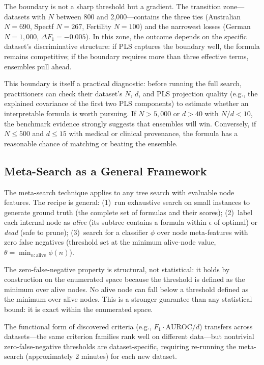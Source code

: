 \documentclass[journal]{IEEEtran}
\begin{document}
The boundary is not a sharp threshold but a gradient.  The transition
zone---datasets with $N$ between 800 and 2{,}000---contains the
three ties (Australian $N = 690$, Spectf $N = 267$, Fertility
$N = 100$) and the narrowest losses (German $N = 1{,}000$,
$\Delta F_1 = -0.005$).  In this zone, the outcome depends on the
specific dataset's discriminative structure: if PLS captures the
boundary well, the formula remains competitive; if the boundary
requires more than three effective terms, ensembles pull ahead.

This boundary is itself a practical diagnostic: before running the
full search, practitioners can check their dataset's $N$, $d$, and
PLS projection quality (e.g., the explained covariance of the first
two PLS components) to estimate whether an interpretable formula is
worth pursuing.  If $N > 5{,}000$ or $d > 40$ with $N/d < 10$, the
benchmark evidence strongly suggests that ensembles will win.
Conversely, if $N \leq 500$ and $d \leq 15$ with medical or
clinical provenance, the formula has a reasonable chance of matching
or beating the ensemble.

\subsection{Meta-Search as a General Framework}
\label{sec:meta-general}

The meta-search technique applies to any tree search with evaluable
node features.  The recipe is general:
(1)~run exhaustive search on small instances to generate ground truth
(the complete set of formulas and their scores);
(2)~label each internal node as \emph{alive} (its subtree contains a
formula within $\epsilon$ of optimal) or \emph{dead} (safe to prune);
(3)~search for a classifier $\phi$ over node meta-features with zero
false negatives (threshold set at the minimum alive-node value,
$\theta = \min_{n:\text{alive}} \phi(n)$).

The zero-false-negative property is structural, not statistical:
it holds by construction on the enumerated space because the
threshold is defined as the minimum over alive nodes.  No alive
node can fall below a threshold defined as the minimum over alive
nodes.  This is a stronger guarantee than any statistical bound: it
is exact within the enumerated space.

The functional form of discovered criteria (e.g., $F_1 \cdot
\text{AUROC}/d$) transfers across datasets---the same criterion
families rank well on different data---but nontrivial
zero-false-negative thresholds are dataset-specific, requiring
re-running the meta-search (approximately 2 minutes) for each new
dataset.
\end{document}
